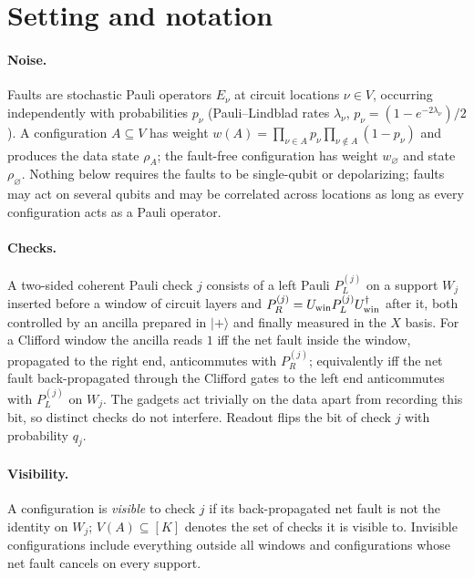 \documentclass[11pt,a4paper]{article}
\theoremstyle{remark}
\begin{document}
\begin{abstract}
error-detecting codes, where the detectors exist anyway, the same logic gives an exact geometric law $E[o\mid k]=O_0\bar\rho^{\,k}$ for the logical observable conditioned on the number $k$ of detected faults, which turns full post-selection into a regression over all shots with effective shot count $N\alpha_0^{1-\bar\rho^2}$ instead of $N\alpha_0$.
\end{abstract}

\tableofcontents

\section{Setting and notation}
\label{sec:setting}

\paragraph{Noise.} Faults are stochastic Pauli operators $E_\nu$ at circuit locations $\nu\in V$, occurring independently with probabilities $p_\nu$ (Pauli--Lindblad rates $\lambda_\nu$, $p_\nu=(1-e^{-2\lambda_\nu})/2$). A configuration $A\subseteq V$ has weight $w(A)=\prod_{\nu\in A}p_\nu\prod_{\nu\notin A}(1-p_\nu)$ and produces the data state $\rho_A$; the fault-free configuration has weight $w_\varnothing$ and state $\rho_\varnothing$. Nothing below requires the faults to be single-qubit or depolarizing; faults may act on several qubits and may be correlated across locations as long as every configuration acts as a Pauli operator.

\paragraph{Checks.} A two-sided coherent Pauli check $j$ consists of a left Pauli $P_L^{(j)}$ on a support $W_j$ inserted before a window of circuit layers and $P_R^{(j)}=U_{\rm win}P_L^{(j)}U_{\rm win}^\dagger$ after it, both controlled by an ancilla prepared in $|+\rangle$ and finally measured in the $X$ basis. For a Clifford window the ancilla reads $1$ iff the net fault inside the window, propagated to the right end, anticommutes with $P_R^{(j)}$; equivalently iff the net fault back-propagated through the Clifford gates to the left end anticommutes with $P_L^{(j)}$ on $W_j$. The gadgets act trivially on the data apart from recording this bit, so distinct checks do not interfere. Readout flips the bit of check $j$ with probability $q_j$.

\paragraph{Visibility.} A configuration is \emph{visible} to check $j$ if its back-propagated net fault is not the identity on $W_j$; $V(A)\subseteq[K]$ denotes the set of checks it is visible to. Invisible configurations include everything outside all windows and configurations whose net fault cancels on every support.
\end{document}
